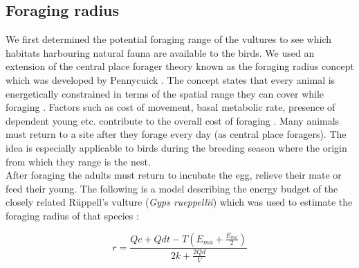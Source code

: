 




\subsection{Foraging radius}
We first determined the potential foraging range of the vultures to see which habitats harbouring natural fauna are available to the birds. We used an extension of the central place forager theory known as the foraging radius concept which was developed by Pennycuick \citep{sinclair1995serengeti}. The concept states that every animal is energetically constrained in terms of the spatial range they can cover while foraging \citep{sinclair1995serengeti}. Factors such as cost of movement, basal metabolic rate, presence of dependent young etc. contribute to the overall cost of foraging \citep{ruxton2002modelling}. Many animals must return to a site after they forage every day (as central place foragers). The idea is especially applicable to birds during the breeding season where the origin from which they range is the nest. \\ 
\indent
After foraging the adults must return to incubate the egg, relieve their mate or feed their young. The following is a model describing the energy budget of the closely related R{\"u}ppell's vulture (\textit{Gyps rueppellii}) which was used to estimate the foraging radius of that species \citep{ruxton2002modelling}:

\[r = \frac{Qc + Qdt - T(E_{ma}+\frac{E_{mc}}{2})}{2k +\frac{2Qd}{V}}\]

